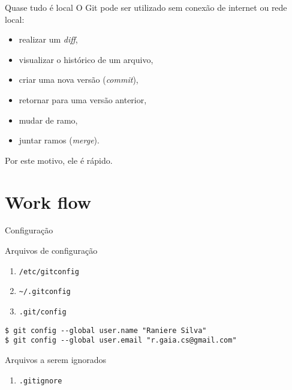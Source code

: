 \documentclass[11pt]{beamer}
\begin{document}
\begin{frame}{Quase tudo é local}
    O Git pode ser utilizado sem conexão de internet ou rede local:
    \begin{itemize}
        \item realizar um \textit{diff}, \pause
        \item visualizar o histórico de um arquivo, \pause
        \item criar uma nova versão (\textit{commit}), \pause
        \item retornar para uma versão anterior, \pause
        \item mudar de ramo, \pause
        \item juntar ramos (\textit{merge}). \pause
    \end{itemize}

    Por este motivo, ele é rápido.
\end{frame}

%

\section{Work flow}
\begin{frame}[fragile]{Configuração}
    \begin{block}{Arquivos de configuração}
        \begin{enumerate}
            \item  \lstinline+/etc/gitconfig+
            \item  \lstinline+~/.gitconfig+
            \item  \lstinline+.git/config+
        \end{enumerate}
    \end{block}
    \pause
    \begin{lstlisting}
$ git config --global user.name "Raniere Silva"
$ git config --global user.email "r.gaia.cs@gmail.com"
    \end{lstlisting}
    \pause
    \begin{block}{Arquivos a serem ignorados}
        \begin{enumerate}
            \item \lstinline+.gitignore+
        \end{enumerate}
    \end{block}
\end{frame}
\end{document}
